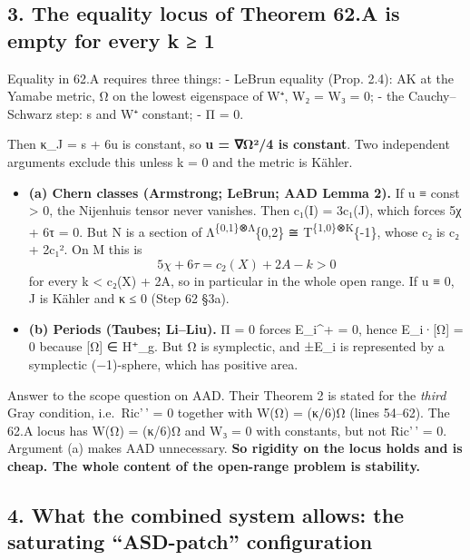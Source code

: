 \documentclass[
  10pt,
]{report}
\providecommand{\tightlist}{%
  \setlength{\itemsep}{0pt}\setlength{\parskip}{0pt}}
\begin{document}
\hypertarget{the-equality-locus-of-theorem-62.a-is-empty-for-every-k-1}{%
\subsection{3. The equality locus of Theorem 62.A is empty for every k ≥
1}\label{the-equality-locus-of-theorem-62.a-is-empty-for-every-k-1}}

Equality in 62.A requires three things: - LeBrun equality (Prop. 2.4):
AK at the Yamabe metric, Ω on the lowest eigenspace of W⁺, W₂ = W₃ = 0;
- the Cauchy--Schwarz step: s and \textbar W⁺\textbar{} constant; - Π =
0.

Then κ\_J = s + 6u is constant, so \textbf{u = \textbar∇Ω\textbar²/4 is
constant}. Two independent arguments exclude this unless k = 0 and the
metric is Kähler.

\begin{itemize}
\tightlist
\item
  \textbf{(a) Chern classes (Armstrong; LeBrun; AAD Lemma 2).} If u ≡
  const \textgreater{} 0, the Nijenhuis tensor never vanishes. Then
  c₁(I) = 3c₁(J), which forces 5χ + 6τ = 0. But N is a section of
  Λ\textsuperscript{\{0,1\}⊗Λ}\{0,2\} ≅
  T\textsuperscript{\{1,0\}⊗K}\{-1\}, whose c₂ is c₂ + 2c₁². On M this
  is \[
  5\chi+6\tau=c_2(X)+2A-k>0
  \] for every k \textless{} c₂(X) + 2A, so in particular in the whole
  open range. If u ≡ 0, J is Kähler and κ ≤ 0 (Step 62 §3a).
\item
  \textbf{(b) Periods (Taubes; Li--Liu).} Π = 0 forces E\_i\^{}+ = 0,
  hence E\_i·{[}Ω{]} = 0 because {[}Ω{]} ∈ H⁺\_g. But Ω is symplectic,
  and ±E\_i is represented by a symplectic (−1)-sphere, which has
  positive area.
\end{itemize}

Answer to the scope question on AAD. Their Theorem 2 is stated for the
\emph{third} Gray condition, i.e.~Ric'\,' = 0 together with W(Ω) =
(κ/6)Ω (lines 54--62). The 62.A locus has W(Ω) = (κ/6)Ω and W₃ = 0 with
constants, but not Ric'\,' = 0. Argument (a) makes AAD unnecessary.
\textbf{So rigidity on the locus holds and is cheap. The whole content
of the open-range problem is stability.}

\hypertarget{what-the-combined-system-allows-the-saturating-asd-patch-configuration}{%
\subsection{4. What the combined system allows: the saturating
``ASD-patch''
configuration}\label{what-the-combined-system-allows-the-saturating-asd-patch-configuration}}
\end{document}

